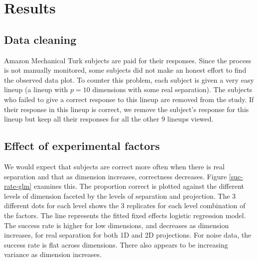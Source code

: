 \section{Results} \label{sec:results}



\subsection{Data cleaning}

Amazon Mechanical Turk subjects are paid for their responses. Since the process is not manually monitored, some subjects did not make an honest effort to find the observed data plot. To counter this problem, each subject is given a very easy lineup (a lineup with $p = 10$ dimensions with some real separation). The subjects who failed to give a correct response to this lineup are removed from the study. If their response in this lineup is correct, we remove the subject's response for this lineup but keep all their responses for all the other 9 lineups viewed.

\subsection{Effect of experimental factors} \label{effects}

We would expect that subjects are correct more often when there is real separation and that as dimension increases, correctness decreases. Figure \ref{suc-rate-glm} examines this. The proportion correct is plotted against the different levels of dimension faceted by the levels of separation and projection. The 3 different dots for each level shows the 3 replicates for each level combination of the factors. The line represents the fitted fixed effects logistic regression model. The success rate is higher for low dimensions, and decreases as dimension increases, for real separation for both 1D and 2D projections. For noise data, the success rate is flat across dimensions. There also appears to be increasing variance as dimension increases.

